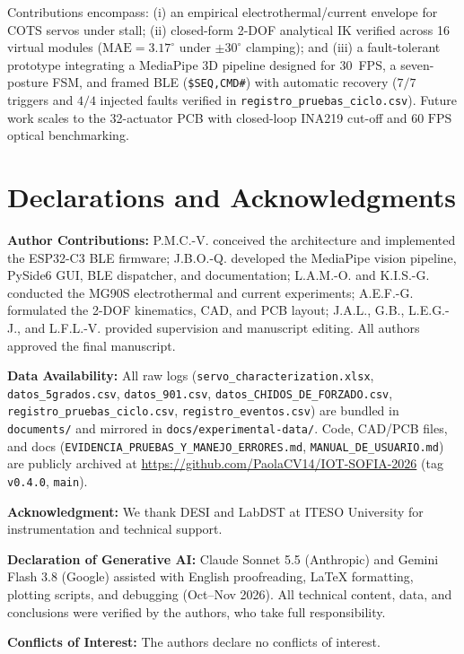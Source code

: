 \documentclass[lettersize,journal]{IEEEtran}
\begin{document}
	Contributions encompass: (i) an empirical electrothermal/current envelope for COTS servos under stall; (ii) closed-form 2-DOF analytical IK verified across 16 virtual modules ($\text{MAE} = 3.17^\circ$ under $\pm 30^\circ$ clamping); and (iii) a fault-tolerant prototype integrating a MediaPipe 3D pipeline designed for 30~FPS, a seven-posture FSM, and framed BLE (\texttt{\$SEQ,CMD\#}) with automatic recovery ($7/7$ triggers and $4/4$ injected faults verified in \texttt{registro\_pruebas\_ciclo.csv}). Future work scales to the 32-actuator PCB with closed-loop INA219 cut-off and $60\text{ FPS}$ optical benchmarking.
	
	\section*{Declarations and Acknowledgments}
	\footnotesize
	
	\noindent\textbf{Author Contributions:} 
	P.M.C.-V. conceived the architecture and implemented the ESP32-C3 BLE firmware;
	J.B.O.-Q. developed the MediaPipe vision pipeline, PySide6 GUI, BLE dispatcher, and documentation;
	L.A.M.-O. and K.I.S.-G. conducted the MG90S electrothermal and current experiments;
	A.E.F.-G. formulated the 2-DOF kinematics, CAD, and PCB layout;
	J.A.L., G.B., L.E.G.-J., and L.F.L.-V. provided supervision and manuscript editing.
	All authors approved the final manuscript.
	
	\noindent\textbf{Data Availability:} 
	All raw logs (\texttt{servo\_characterization.xlsx}, \texttt{datos\_5grados.csv}, \texttt{datos\_901.csv}, \texttt{datos\_CHIDOS\_DE\_FORZADO.csv}, \texttt{registro\_pruebas\_ciclo.csv}, \texttt{registro\_eventos.csv}) are bundled in \texttt{documents/} and mirrored in \texttt{docs/experimental-data/}. Code, CAD/PCB files, and docs (\texttt{EVIDENCIA\_PRUEBAS\_Y\_MANEJO\_ERRORES.md}, \texttt{MANUAL\_DE\_USUARIO.md}) are publicly archived at \url{https://github.com/PaolaCV14/IOT-SOFIA-2026} (tag \texttt{v0.4.0}, \texttt{main}).
	
	\noindent\textbf{Acknowledgment:} 
	We thank DESI and LabDST at ITESO University for instrumentation and technical support.
	
	\noindent\textbf{Declaration of Generative AI:} Claude Sonnet 5.5 (Anthropic) and Gemini Flash 3.8 (Google) assisted with English proofreading, \LaTeX{} formatting, plotting scripts, and debugging (Oct--Nov 2026). All technical content, data, and conclusions were verified by the authors, who take full responsibility.
	
	\noindent\textbf{Conflicts of Interest:} 
	The authors declare no conflicts of interest.
	
	\balance
	
	
	
\end{document}
